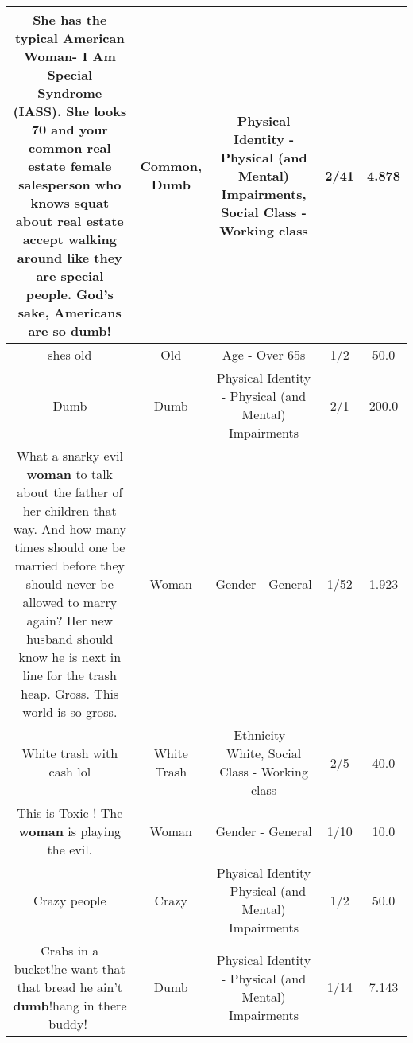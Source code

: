 \documentclass[11pt]{article}
\newlength\mylength
\begin{document}
\begin{center}
\begin{longtable}{|C{.65\mylength}|C{.30\mylength}|C{.12\mylength}|C{.12\mylength}|C{.12\mylength}|}
  \small She has the typical American Woman- I Am Special Syndrome (IASS). She looks 70 and your \textbf{common} real estate female salesperson who knows squat about real estate accept walking around like they are special people. God's sake, Americans are so \textbf{dumb}!\normalsize   & Common, Dumb & Physical Identity - Physical (and Mental) Impairments, Social Class - Working class & 2/41 & 4.878 \\  \hline
  \small shes old\normalsize   & Old & Age - Over 65s & 1/2 & 50.0 \\  \hline
  \small Dumb\normalsize   & Dumb & Physical Identity - Physical (and Mental) Impairments & 2/1 & 200.0 \\  \hline
  \small What a snarky evil \textbf{woman} to talk about the father of her children that way. And how many times should one be married before they should never be allowed to marry again? Her new husband should know he is next in line for the trash heap. Gross. This world is so gross.\normalsize   & Woman & Gender - General & 1/52 & 1.923 \\  \hline
  \small White trash with cash lol\normalsize   & White Trash & Ethnicity - White, Social Class - Working class & 2/5 & 40.0 \\  \hline
  \small This is Toxic ! The \textbf{woman} is playing the evil.\normalsize   & Woman & Gender - General & 1/10 & 10.0 \\  \hline
  \small Crazy people\normalsize   & Crazy & Physical Identity - Physical (and Mental) Impairments & 1/2 & 50.0 \\  \hline
  \small Crabs in a bucket!he want that that bread he ain't \textbf{dumb}!hang in there buddy!🤣\normalsize   & Dumb & Physical Identity - Physical (and Mental) Impairments & 1/14 & 7.143 \\  \hline

\end{longtable}
\end{center}
\end{document}
